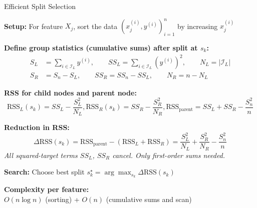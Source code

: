 \documentclass[10pt,compress,t,notes=noshow, xcolor=table]{beamer}
\begin{document}
\begin{framev}[align=top]{Efficient Split Selection}
\begin{itemizeM}
\item \textbf{Setup:} For feature $X_j$, sort the data $(x_j^{(i)}, y^{(i)})_{i=1}^n$ by increasing $x_j^{(i)}$


\item \textbf{Define group statistics (cumulative sums) after split at $s_k$:}
$$
\begin{aligned}
S_L &= \textstyle\sum_{i \in \mathcal{I}_L} y^{(i)}, \qquad
SS_L = \sum_{i \in \mathcal{I}_L} (y^{(i)})^2, \qquad
N_L = |\mathcal{I}_L| \\
S_R &= \textstyle S_n - S_L, \qquad
SS_R = SS_n - SS_L, \qquad
N_R = n - N_L
\end{aligned}
$$
\item \textbf{RSS for child nodes and parent node:}
$$
\text{RSS}_L(s_k) = SS_L - \frac{S_L^2}{N_L},
\text{RSS}_R(s_k) = SS_R - \frac{S_R^2}{N_R},
\text{RSS}_{\text{parent}} = SS_L + SS_R - \frac{S_n^2}{n}
$$
\item<2-> \textbf{Reduction in RSS:}
$$
\Delta\text{RSS}(s_k) = \text{RSS}_{\text{parent}} - (\text{RSS}_L + \text{RSS}_R)
= \frac{S_L^2}{N_L} + \frac{S_R^2}{N_R} - \frac{S_n^2}{n}
$$
\emph{All squared-target terms $SS_L$, $SS_R$ cancel. Only first-order sums needed.}
\item<2-> \textbf{Search:} Choose best split $s_k^\star = \arg\max_{s_k} \Delta\text{RSS}(s_k)$
\item<2-> \textbf{Complexity per feature:}\\
$O(n\log n)$ (sorting) + $O(n)$ (cumulative sums and scan)
\end{itemizeM}
\end{framev}
\end{document}

